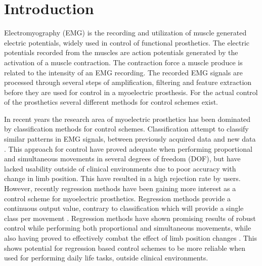 
\section{Introduction}			%

Electromyography (EMG) is the recording and utilization of muscle generated electric potentials, widely used in control of functional prosthetics. The electric potentials recorded from the muscles are action potentials generated by the activation of a muscle contraction. The contraction force a muscle produce is related to the intensity of an EMG recording. The recorded EMG signals are processed through several steps of amplification, filtering and feature extraction before they are used for control in a myoelectric prosthesis. \cite{Cram2012, Fougner2012} For the actual control of the prosthetics several different methods for control schemes exist.

In recent years the research area of myoelectric prosthetics has been dominated by classification methods for control schemes. Classification attempt to classify similar patterns in EMG signals, between previously acquired data and new data \cite{Mendez2017}. This approach for control have proved adequate when performing proportional and simultaneous movements in several degrees of freedom (DOF), but have lacked usability outside of clinical environments due to poor accuracy with change in limb position. This have resulted in a high rejection rate by users. 
However, recently regression methods have been gaining more interest as a control scheme for myoelectric prosthetics. Regression methods provide a continuous output value, contrary to classification which will provide a single class per movement \cite{Hahne2014}. Regression methods have shown promising results of robust control while performing both proportional and simultaneous movements, while also having proved to effectively combat the effect of limb position changes \cite{Hwang2017, Hanhe2014}. This shows potential for regression based control schemes to be more reliable when used for performing daily life tasks, outside clinical environments.

